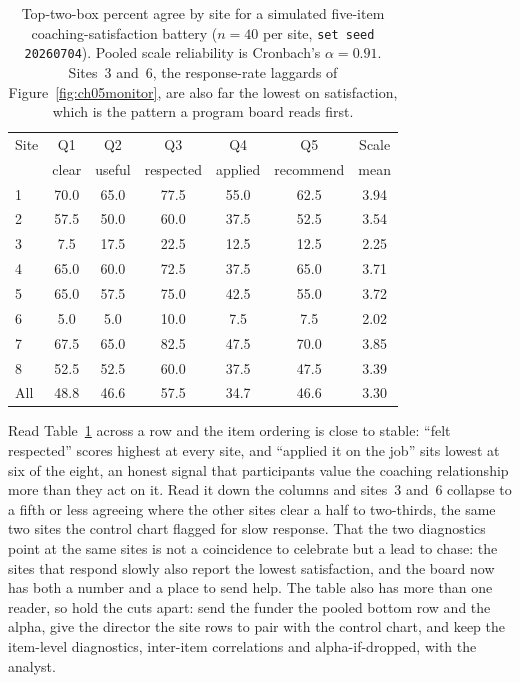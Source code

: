 \begin{table}[htbp]
\centering
\caption[Percent agree by site, simulated coaching battery]{Top-two-box percent agree by site for a simulated five-item coaching-satisfaction battery ($n=40$ per site, \texttt{set seed 20260704}). Pooled scale reliability is Cronbach's $\alpha=0.91$. Sites~3 and~6, the response-rate laggards of Figure~\ref{fig:ch05monitor}, are also far the lowest on satisfaction, which is the pattern a program board reads first.}
\label{tab:ch05agree}
{\footnotesize
\begin{tabular}{lcccccc}
\hline
Site & Q1 & Q2 & Q3 & Q4 & Q5 & Scale \\
     & clear & useful & respected & applied & recommend & mean \\
\hline
1 & 70.0 & 65.0 & 77.5 & 55.0 & 62.5 & 3.94 \\
2 & 57.5 & 50.0 & 60.0 & 37.5 & 52.5 & 3.54 \\
3 &  7.5 & 17.5 & 22.5 & 12.5 & 12.5 & 2.25 \\
4 & 65.0 & 60.0 & 72.5 & 37.5 & 65.0 & 3.71 \\
5 & 65.0 & 57.5 & 75.0 & 42.5 & 55.0 & 3.72 \\
6 &  5.0 &  5.0 & 10.0 &  7.5 &  7.5 & 2.02 \\
7 & 67.5 & 65.0 & 82.5 & 47.5 & 70.0 & 3.85 \\
8 & 52.5 & 52.5 & 60.0 & 37.5 & 47.5 & 3.39 \\
\hline
All & 48.8 & 46.6 & 57.5 & 34.7 & 46.6 & 3.30 \\
\hline
\end{tabular}
}
\end{table}

Read Table~\ref{tab:ch05agree} across a row and the item ordering is close to stable: \enquote{felt respected} scores highest at every site, and \enquote{applied it on the job} sits lowest at six of the eight, an honest signal that participants value the coaching relationship more than they act on it. Read it down the columns and sites~3 and~6 collapse to a fifth or less agreeing where the other sites clear a half to two-thirds, the same two sites the control chart flagged for slow response. That the two diagnostics point at the same sites is not a coincidence to celebrate but a lead to chase: the sites that respond slowly also report the lowest satisfaction, and the board now has both a number and a place to send help. The table also has more than one reader, so hold the cuts apart: send the funder the pooled bottom row and the alpha, give the director the site rows to pair with the control chart, and keep the item-level diagnostics, inter-item correlations and alpha-if-dropped, with the analyst.

